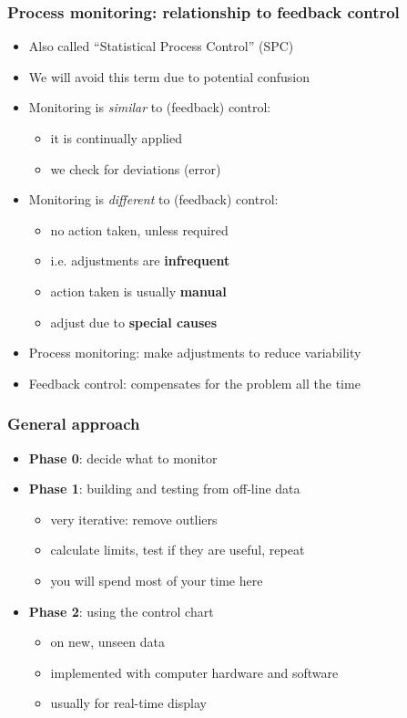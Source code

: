 \begin{frame}\frametitle{Process monitoring: relationship to feedback control}
	\begin{itemize}
		\item	Also called ``Statistical Process Control'' (SPC)
		\item	We will avoid this term due to potential confusion
		\item	Monitoring is \emph{similar} to (feedback) control:
		\begin{itemize}
			\item	it is continually applied
			\item	we check for deviations (error)
		\end{itemize}
		\item	Monitoring is \emph{different} to (feedback) control:
		\begin{itemize}
			\item	no action taken, unless required
			\item	i.e. adjustments are \textbf{infrequent}
			\item	action taken is usually \textbf{manual}
			\item	adjust due to \textbf{special causes}
		\end{itemize}
	\end{itemize}
	\begin{itemize}
		\item	Process monitoring: make {} adjustments to reduce variability
		\item	Feedback control: {} compensates for the problem all the time
	\end{itemize}
\end{frame}

\begin{frame}\frametitle{General approach}
	\begin{itemize}
		\item	\textbf{Phase 0}: decide what to monitor
		\item	\textbf{Phase 1}: building and testing from off-line data
		\begin{itemize}
			\item	very iterative: remove outliers
			\item	calculate limits, test if they are useful, repeat
			\item	you will spend most of your time here
		\end{itemize}
	\end{itemize}
	\begin{itemize}
		\item	\textbf{Phase 2}: using the control chart
		\begin{itemize}
			\item	on new, unseen data
			\item	implemented with computer hardware and software
			\item	usually for real-time display
		\end{itemize}
	\end{itemize}
\end{frame}


